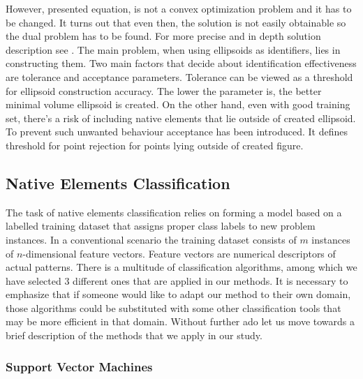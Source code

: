 \documentclass{llncs}
\begin{document}
However, presented equation, is not a convex optimization problem and it has to be changed. It turns out that even then, the solution is not easily obtainable so the dual problem has to be found. For more precise and in depth solution description see \cite{MVEEMichaelTodd2005}. The main problem, when using ellipsoids as identifiers, lies in constructing them. Two main factors that decide about identification effectiveness are tolerance and acceptance parameters. Tolerance can be viewed as a threshold for ellipsoid construction accuracy. The lower the parameter is, the better minimal volume ellipsoid is created. On the other hand, even with good training set, there's a risk of including native elements that lie outside of created ellipsoid. To prevent such unwanted behaviour acceptance has been introduced. It defines threshold for point rejection for points lying outside of created figure.  

\vspace{-6pt}
\subsection{Native Elements Classification}
  \label{sec:Classifiers}
\vspace{-3pt}

The task of native elements classification relies on forming a model based on a labelled training dataset that assigns proper class labels to new problem instances. In a conventional scenario the training dataset consists of $m$ instances of $n$-dimensional feature vectors. Feature vectors are numerical descriptors of actual patterns. There is a multitude of classification algorithms, among which we have selected 3 different ones that are applied in our methods. It is necessary to emphasize that if someone would like to adapt our method to their own domain, those algorithms could be substituted with some other classification tools that may be more efficient in that domain. Without further ado let us move towards a brief description of the methods that we apply in our study.

\vspace{-9pt}
\subsubsection{Support Vector Machines}
\end{document}
